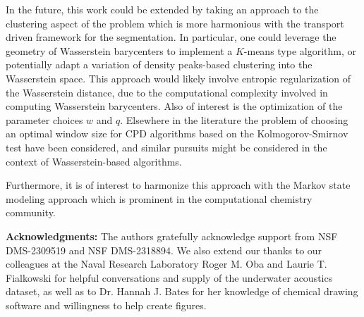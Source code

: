 \documentclass{article}
\begin{document}
In the future, this work could be extended by taking an approach to the clustering aspect of the problem which is more harmonious with the transport driven framework for the segmentation. In particular, one could leverage the geometry of Wasserstein barycenters to implement a \(K\)-means type algorithm, or potentially adapt a variation of density peaks-based clustering into the Wasserstein space. This approach would likely involve entropic regularization of the Wasserstein distance, due to the computational complexity involved in computing Wasserstein barycenters.  Also of interest is the optimization of the parameter choices \(w\) and \(q\). Elsewhere in the literature the problem of choosing an optimal window size for CPD algorithms based on the Kolmogorov-Smirnov test have been considered, and similar pursuits might be considered in the context of Wasserstein-based algorithms.

Furthermore, it is of interest to harmonize this approach with the Markov state modeling approach which is prominent in the computational chemistry community. 

\vspace{10pt}

\noindent\textbf{Acknowledgments:}  The authors gratefully acknowledge support from NSF DMS-2309519 and NSF DMS-2318894. We also extend our thanks to our colleagues at the Naval Research Laboratory Roger M. Oba and Laurie T. Fialkowski for helpful conversations and supply of the underwater acoustics dataset, as well as to Dr. Hannah J. Bates for her knowledge of chemical drawing software and willingness to help create figures.
\printbibliography
\end{document}
